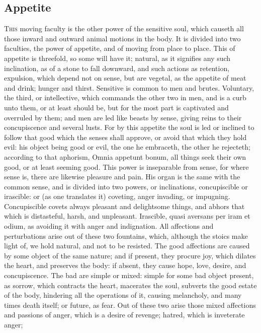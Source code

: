 {\subsection{Appetite}
\lettrine{T}{his} moving faculty is the other power of the sensitive
soul, which causeth all those inward and outward animal motions in the
body. It is divided into two faculties, the power of appetite, and of
moving from place to place. This of appetite is threefold, so some will
have it; natural, as it signifies any such inclination, as of a stone
to fall downward, and such actions as retention, expulsion, which
depend not on sense, but are vegetal, as the appetite of meat and
drink; hunger and thirst. Sensitive is common to men and brutes.
Voluntary, the third, or intellective, which commands the other two in
men, and is a curb unto them, or at least should be, but for the most
part is captivated and overruled by them; and men are led like beasts
by sense, giving reins to their concupiscence and several lusts. For by
this appetite the soul is led or inclined to follow that good which the
senses shall approve, or avoid that which they hold evil: his object
being good or evil, the one he embraceth, the other he rejecteth;
according to that aphorism, Omnia appetunt bonum, all things seek their
own good, or at least seeming good. This power is inseparable from
sense, for where sense is, there are likewise pleasure and pain. His
organ is the same with the common sense, and is divided into two
powers, or inclinations, concupiscible or irascible: or (as one 
translates it) coveting, anger invading, or impugning. Concupiscible
covets always pleasant and delightsome things, and abhors that which is
distasteful, harsh, and unpleasant. Irascible, quasi  aversans per
iram et odium, as avoiding it with anger and indignation. All
affections and perturbations arise out of these two fountains, which,
although the stoics make light of, we hold natural, and not to be
resisted. The good affections are caused by some object of the same
nature; and if present, they procure joy, which dilates the heart, and
preserves the body: if absent, they cause hope, love, desire, and
concupiscence. The bad are simple or mixed: simple for some bad object
present, as sorrow, which contracts the heart, macerates the soul,
subverts the good estate of the body, hindering all the operations of
it, causing melancholy, and many times death itself; or future, as
fear. Out of these two arise those mixed affections and passions of
anger, which is a desire of revenge; hatred, which is inveterate anger;
}
